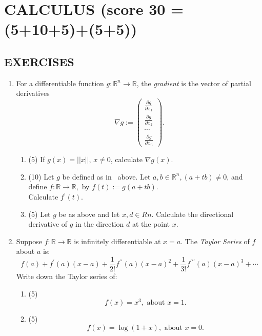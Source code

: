 \documentclass[12pt]{article}
\newtheorem*{solution}{Solution}
\newtheorem*{comments}{Comments}
\numberwithin{equation}{section}  %
\numberwithin{table}{section}
\numberwithin{algorithm}{section}
\def\R{\mathbb{R}}
\def\Rn{\mathbb{R}^n}
\theoremstyle{definition}
\newcommand{\<}{\langle}
\renewcommand{\>}{\rangle}
\begin{document}
\section{CALCULUS
{\small(score 30 = (5+10+5)+(5+5))}
}
\subsection{EXERCISES}
\begin{enumerate}
\item 
For a differentiable function $g: \Rn \rightarrow \R$, 
the {\em gradient} is the vector of partial derivatives
\begin{equation}
\label{eq:gradient}
\nabla g := \begin{pmatrix}
   \frac{\partial g}{\partial x_1}\\ 
   \frac{\partial g}{\partial x_2}\\ 
     \cdots\\ \frac{\partial
g}{\partial x_n}
\end{pmatrix}.
\end{equation}
\begin{enumerate}
\item 
\label{item:fng}
(5)
If $g(x) = || x ||,\, x\neq 0$, calculate $\nabla g(x)$.
\item (10)
Let $g$ be defined as in~ above.
Let $a,b \in \Rn, (a+tb)\neq 0$, and define $f:\R \rightarrow \R,$ by
$f(t) := g(a+tb)$.
\\Calculate $f^\prime (t)$.
\item
(5) Let $g$ be as above and let $x,d\in Rn$. Calculate the directional
derivative of $g$ in the direction $d$ at the point $x$.
\end{enumerate}
\item
Suppose $f:\R \rightarrow \R$ is infinitely differentiable at $x=a.$
The {\em Taylor Series} of $f$ about $a$ is:
\[
f(a) + f^\prime(a) (x-a) + \frac1{2!}f^{\prime \prime}(a)(x-a)^2 + 
    \frac1{3!}f^{\prime \prime \prime}(a)(x-a)^3 + \cdots
\]
Write down the Taylor series of:
\begin{enumerate}
\item (5)
\[
f(x) = x^3, \mbox{~about~} x=1.
\]
\item (5)
\[
f(x) = \log(1+x), \mbox{~about~} x=0.
\]
\end{enumerate}
\end{enumerate}
\end{document}

